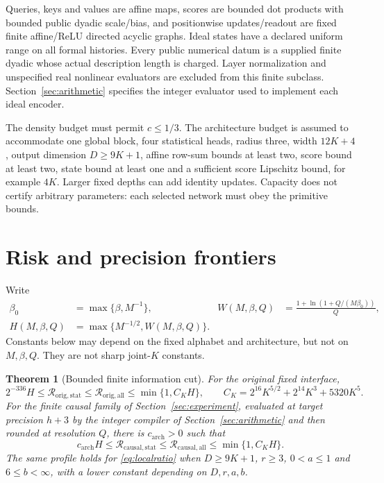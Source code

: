 \documentclass[11pt,letterpaper]{article}
\newtheorem{theorem}{Theorem}[section]
\theoremstyle{definition}\newtheorem{definition}[theorem]{Definition}
\theoremstyle{remark}\newtheorem{remark}[theorem]{Remark}
\newcommand{\betaz}{\beta_0}
\newcommand{\Risk}{\mathcal{R}}
\begin{document}
Queries, keys and values are affine maps, scores are bounded dot products with bounded public dyadic scale/bias, and positionwise updates/readout are fixed finite affine/ReLU directed acyclic graphs. Ideal states have a declared uniform range on all formal histories. Every public numerical datum is a supplied finite dyadic whose actual description length is charged. Layer normalization and unspecified real nonlinear evaluators are excluded from this finite subclass. Section~\ref{sec:arithmetic} specifies the integer evaluator used to implement each ideal encoder.

The density budget must permit $c\le1/3$. The architecture budget is assumed to accommodate one global block, four statistical heads, radius three, width $12K+4$, output dimension $D\ge9K+1$, affine row-sum bounds at least two, score bound at least two, state bound at least one and a sufficient score Lipschitz bound, for example $4K$. Larger fixed depths can add identity updates. Capacity does not certify arbitrary parameters: each selected network must obey the primitive bounds.

\section{Risk and precision frontiers}\label{sec:main}
Write
\begin{equation}\label{eq:profile}
 \begin{aligned}
 \betaz&=\max\{\beta,M^{-1}\},&
 W(M,\beta,Q)&=\frac{1+\ln(1+Q/(M\betaz))}{Q},\\
 H(M,\beta,Q)&=\max\{M^{-1/2},W(M,\beta,Q)\}.&&
 \end{aligned}
\end{equation}
Constants below may depend on the fixed alphabet and architecture, but not on $M,\beta,Q$. They are not sharp joint-$K$ constants.

\begin{theorem}[Bounded finite information cut]\label{thm:main}
For the original fixed interface,
\begin{equation}\label{eq:original}
 2^{-336}H\le\Risk_{\mathrm{orig},\mathrm{stat}}
 \le\Risk_{\mathrm{orig},\mathrm{all}}\le\min\{1,C_KH\},
 \qquad C_K=2^{16}K^{5/2}+2^{14}K^3+5320K^5.
\end{equation}
For the finite causal family of Section~\ref{sec:experiment}, evaluated at target precision $h+3$ by the integer compiler of Section~\ref{sec:arithmetic} and then rounded at resolution $Q$, there is $c_{\mathrm{arch}}>0$ such that
\begin{equation}\label{eq:causalmain}
 c_{\mathrm{arch}}H\le\Risk_{\mathrm{causal},\mathrm{stat}}
 \le\Risk_{\mathrm{causal},\mathrm{all}}\le\min\{1,C_KH\}.
\end{equation}
The same profile holds for \eqref{eq:localratio} when $D\ge9K+1$, $r\ge3$, $0<a\le1$ and $6\le b<\infty$, with a lower constant depending on $D,r,a,b$.
\end{theorem}
\end{document}

